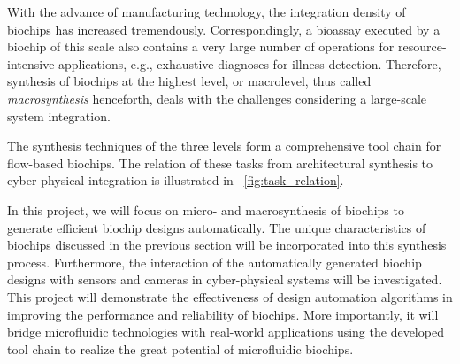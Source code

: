 With the advance of manufacturing technology, 
the integration density of biochips has increased tremendously.
Correspondingly, a bioassay executed by a biochip of this scale also
contains a very large number of operations for resource-intensive
applications, e.g., exhaustive diagnoses for illness detection.
Therefore, synthesis of biochips at the highest level, or macrolevel, 
thus called \textit{macrosynthesis} henceforth,
deals with the challenges considering a large-scale system integration.

The synthesis techniques of the three levels form a comprehensive tool chain
for flow-based biochips. %
The relation of these tasks from architectural synthesis to cyber-physical
integration is illustrated in
\figname~\ref{fig:task_relation}.

In this project, we will focus on micro- and macrosynthesis of biochips to
generate efficient biochip 
designs
automatically. 
The unique characteristics of biochips discussed in the previous section 
will be incorporated into this synthesis process. Furthermore, the interaction
of the automatically generated biochip 
designs
with sensors and cameras in
cyber-physical systems will be investigated.
This %
project will demonstrate the effectiveness of 
design automation algorithms in improving the performance and reliability of
biochips. More importantly, it will bridge microfluidic technologies 
with real-world applications using the developed tool chain to realize the great potential of
microfluidic biochips. 
 
